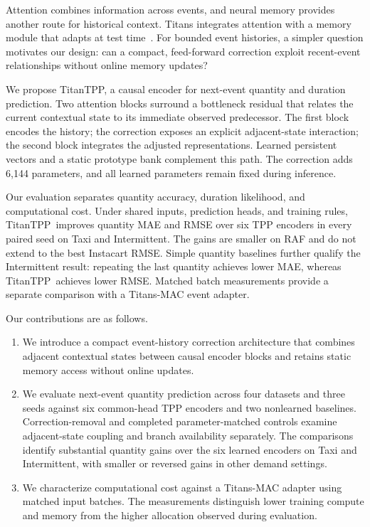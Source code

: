 \documentclass[runningheads]{llncs}
\newcommand{\method}{TitanTPP}
\begin{document}
Attention combines information across events, and neural memory provides
another route for historical context. Titans integrates attention with a
memory module that adapts at test time~\cite{behrouz2025titans}. For bounded
event histories, a simpler question motivates our design: can a compact,
feed-forward correction exploit recent-event relationships without online
memory updates?

We propose \method, a causal encoder for next-event quantity and duration
prediction. Two attention blocks surround a bottleneck residual that relates
the current contextual state to its immediate observed predecessor. The first
block encodes the history; the correction exposes an explicit adjacent-state
interaction; the second block integrates the adjusted representations.
Learned persistent vectors and a static prototype bank complement this path.
The correction adds 6,144 parameters, and all learned parameters remain fixed
during inference.

Our evaluation separates quantity accuracy, duration likelihood, and
computational cost. Under shared inputs, prediction heads, and training rules,
\method\ improves quantity MAE and RMSE over six TPP encoders in every paired
seed on Taxi and Intermittent. The gains are smaller on RAF and do not extend
to the best Instacart RMSE. Simple quantity baselines further qualify the
Intermittent result: repeating the last quantity achieves lower MAE, whereas
\method\ achieves lower RMSE. Matched batch measurements provide a separate
comparison with a Titans-MAC event adapter.

Our contributions are as follows.
\begin{enumerate}
\item We introduce a compact event-history correction architecture that
combines adjacent contextual states between causal encoder blocks and retains
static memory access without online updates.
\item We evaluate next-event quantity prediction across four datasets and
three seeds against six common-head TPP encoders and two nonlearned baselines.
Correction-removal and completed parameter-matched controls examine
adjacent-state coupling and branch availability separately. The comparisons
identify substantial quantity gains over the six learned encoders on Taxi
and Intermittent, with smaller or reversed gains in other demand settings.
\item We characterize computational cost against a Titans-MAC adapter using
matched input batches. The measurements distinguish lower training compute
and memory from the higher allocation observed during evaluation.
\end{enumerate}
\end{document}
